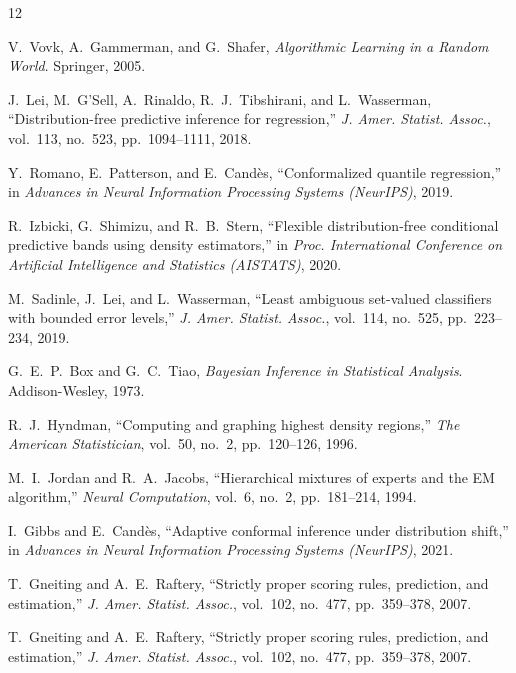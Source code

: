 \documentclass[11pt]{article}
\begin{document}
\begin{thebibliography}{12}

V.~Vovk, A.~Gammerman, and G.~Shafer, \emph{Algorithmic Learning in a Random World}. Springer,
2005.

J.~Lei, M.~G'Sell, A.~Rinaldo, R.~J.~Tibshirani, and L.~Wasserman, ``Distribution-free predictive
inference for regression,'' \emph{J. Amer. Statist. Assoc.}, vol.~113, no.~523, pp.~1094--1111,
2018.

Y.~Romano, E.~Patterson, and E.~Cand\`es, ``Conformalized quantile regression,'' in \emph{Advances
in Neural Information Processing Systems (NeurIPS)}, 2019.

R.~Izbicki, G.~Shimizu, and R.~B.~Stern, ``Flexible distribution-free conditional predictive bands
using density estimators,'' in \emph{Proc. International Conference on Artificial Intelligence and
Statistics (AISTATS)}, 2020.

M.~Sadinle, J.~Lei, and L.~Wasserman, ``Least ambiguous set-valued classifiers with bounded error
levels,'' \emph{J. Amer. Statist. Assoc.}, vol.~114, no.~525, pp.~223--234, 2019.

G.~E.~P.~Box and G.~C.~Tiao, \emph{Bayesian Inference in Statistical Analysis}. Addison-Wesley,
1973.

R.~J.~Hyndman, ``Computing and graphing highest density regions,'' \emph{The American
Statistician}, vol.~50, no.~2, pp.~120--126, 1996.

M.~I.~Jordan and R.~A.~Jacobs, ``Hierarchical mixtures of experts and the EM algorithm,''
\emph{Neural Computation}, vol.~6, no.~2, pp.~181--214, 1994.

I.~Gibbs and E.~Cand\`es, ``Adaptive conformal inference under distribution shift,'' in
\emph{Advances in Neural Information Processing Systems (NeurIPS)}, 2021.

T.~Gneiting and A.~E.~Raftery, ``Strictly proper scoring rules, prediction, and estimation,''
\emph{J. Amer. Statist. Assoc.}, vol.~102, no.~477, pp.~359--378, 2007.

T.~Gneiting and A.~E.~Raftery, ``Strictly proper scoring rules, prediction, and estimation,''
\emph{J. Amer. Statist. Assoc.}, vol.~102, no.~477, pp.~359--378, 2007.


\end{thebibliography}
\end{document}
